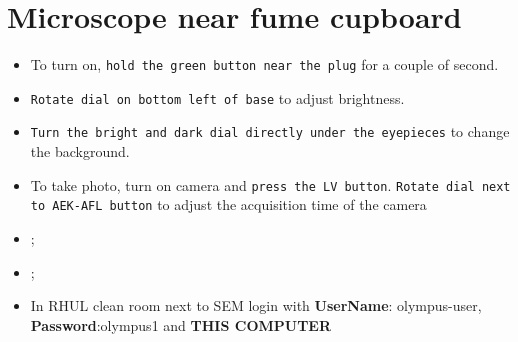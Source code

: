 \section{Microscope near fume cupboard\label{sec:micro}}
  \begin{itemize}
  	\item To turn on, \texttt{hold the green button near the plug} for a couple of second.
  	\item \texttt{Rotate dial on bottom left of base} to adjust brightness.
  	\item \texttt{Turn the bright and dark dial directly under the eyepieces} to change the background.
  	\item To take photo, turn on camera and \texttt{press the LV button}. \texttt{Rotate dial next to AEK-AFL button} to adjust the acquisition time of the camera
	  	\item {};
	\item {};
	\item In RHUL clean room next to SEM login with \textbf{UserName}: olympus-user, \textbf{Password}:olympus1 and \textbf{THIS COMPUTER } \ra {} \ra {} \ra {}  	
  \end{itemize}

 \newpage
 